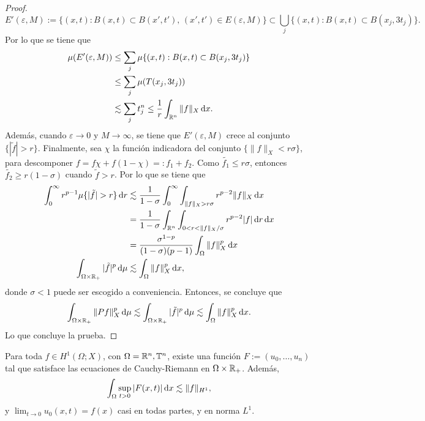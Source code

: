 \begin{proof}
	\begin{equation*}
		E'(\varepsilon, M) := \{(x, t) : B(x, t) \subset B(x', t'), \, (x', t') \in E(\varepsilon, M)\} \subset \bigcup_j \{(x, t): B(x, t)\subset B(x_j, 3t_j)\}.
	\end{equation*}
	Por lo que se tiene que 
	\begin{align*}
		\mu (E'(\varepsilon, M) ) & \leq \sum_j \mu \{(x, t): B(x, t)\subset B(x_j, 3t_j)\} \\
		& \leq \sum_j \mu (T(x_j, 3t_j)) \\
		& \lesssim \sum_j t_j^n 
		 \leq \frac{1}{r} \int_{\mathbb{R}^n} \|f\|_X\mathop{}\!\mathrm{d} x.
	\end{align*}
	Además, cuando $\varepsilon\to0$ y $M\to\infty$, se tiene que $E'(\varepsilon, M)$ crece al conjunto $\{|\tilde{f}|>r\} $. Finalmente, sea $\chi$ la función indicadora del conjunto $\{\|f\|_X<r\sigma\}$, para descomponer $f=f\chi + f(1-\chi)=:f_1+f_2$. Como $\tilde{f_1} \leq r\sigma$, entonces $\tilde{f_2} \geq r(1-\sigma)$ cuando $\tilde{f}>r$. Por lo que se tiene que
	\begin{align*}
		\int_0^\infty r^{p-1} \mu\{|\tilde{f}|>r\} \diff r & \lesssim \frac{1}{1-\sigma} \int_0^\infty \int_{\|f\|_X>r\sigma} r^{p-2} \|f\|_X \diff x \\
		& = \frac{1}{1-\sigma}\int_{\R^n}\int_{0<r<\|f\|_X/\sigma} r^{p-2}|f|\diff r \diff x \\
		& = \frac{\sigma^{1-p}}{(1-\sigma)(p-1)} \int_{\Omega}\|f\|_X^p \diff x \\
		\int_{\Omega\times\R_+} |\tilde{f}|^p \diff \mu & \lesssim \int_{\Omega}\|f\|_X^p \diff x,
	\end{align*}
	donde $\sigma<1$ puede ser escogido a conveniencia. Entonces, se concluye que 
	\begin{equation*}
		\int_{\Omega\times\mathbb{R}_+} \|Pf\|_X^p \mathop{}\!\mathrm{d} \mu\lesssim \int_{\Omega\times\mathbb{R}_+} |\tilde{f}|^p \mathop{}\!\mathrm{d} \mu \lesssim \int_{\Omega}\|f\|_X^p \mathop{}\!\mathrm{d} x.
	\end{equation*}
	Lo que concluye la prueba.
\end{proof}
\begin{theorem}\label{theo:H1-F}
	Para toda $f\in H^1(\Omega;X)$, con $\Omega =\mathbb{R}^n,\mathbb{T}^n$, existe una función $F:=(u_0, \ldots, u_n)$ tal que satisface las ecuaciones de Cauchy-Riemann en $\Omega\times\mathbb{R}_+$. Además, 
	\begin{equation*}
	\int_{\Omega} \sup_{t>0}  |F(x, t)| \mathop{}\!\mathrm{d} x \lesssim \|f\|_{H^1},
	\end{equation*}
	 y $\lim_{t\to0}u_0(x, t) = f(x)$ casi en todas partes, y  en norma $L^1$.
\end{theorem}

